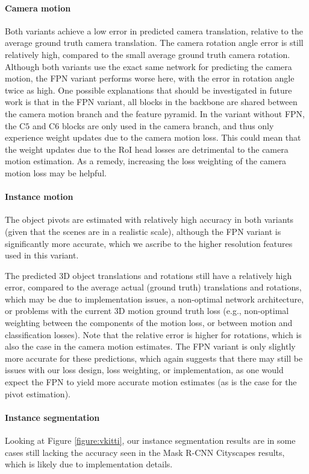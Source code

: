 \paragraph{Camera motion}
Both variants achieve a low error in predicted camera translation, relative to
the average ground truth camera translation. The camera rotation angle error
is still relatively high, compared to the small average ground truth camera rotation.
Although both variants use the exact same network for predicting the camera motion,
the FPN variant performs worse here, with the error in rotation angle twice as high.
One possible explanations that should be investigated in future work is
that in the FPN variant, all blocks in the backbone are shared between the camera
motion branch and the feature pyramid. In the variant without FPN, the C$5$ and
C$6$ blocks are only used in the camera branch, and thus only experience weight
updates due to the camera motion loss. This could mean that the weight updates due
to the RoI head losses are detrimental to the camera motion estimation.
As a remedy, increasing the loss weighting of the camera motion loss may be
helpful.

\paragraph{Instance motion}
The object pivots are estimated with relatively
high accuracy in both variants (given that the scenes are in a realistic scale),
although the FPN variant is significantly more
accurate, which we ascribe to the higher resolution features used in this variant.

The predicted 3D object translations and rotations still have a relatively high
error, compared to the average actual (ground truth) translations and rotations,
which may be due to implementation issues, a non-optimal network architecture,
or problems with the current 3D motion ground truth loss
(e.g., non-optimal weighting between the components of the motion loss, or between motion and classification losses).
Note that the relative error is higher for rotations, which is
also the case in the camera motion estimates.
The FPN variant is only slightly more accurate for these predictions, which again suggests
that there may still be issues with our loss design, loss weighting, or implementation, as one would expect the
FPN to yield more accurate motion estimates (as is the case for the pivot estimation).

\paragraph{Instance segmentation}
Looking at Figure \ref{figure:vkitti}, our instance segmentation results are in
some cases still lacking the accuracy seen in the Mask R-CNN Cityscapes \cite{MaskRCNN} results,
which is likely due to implementation details.
